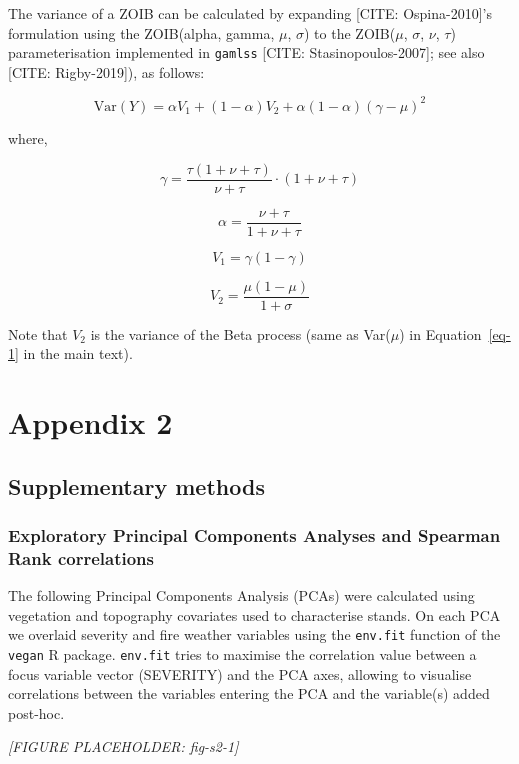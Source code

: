\documentclass[
  numafflabel,
  authoryear,
  preprint]{elsarticle}
\begin{document}
The variance of a ZOIB can be calculated by expanding {[}CITE:
Ospina-2010{]}'s formulation using the ZOIB(alpha, gamma, \(\mu\),
\(\sigma\)) to the ZOIB(\(\mu\), \(\sigma\), \(\nu\), \(\tau\))
parameterisation implemented in \texttt{gamlss} {[}CITE:
Stasinopoulos-2007{]}; see also {[}CITE: Rigby-2019{]}), as follows:

\[
\text{Var}(Y) = \alpha V_1 + (1 - \alpha) V_2 + \alpha (1 - \alpha)(\gamma - \mu)^2
\]

where,

\[
\gamma = \frac{\tau (1 + \nu + \tau)}{\nu + \tau} \cdot (1 + \nu + \tau)
\]

\[
\alpha = \frac{\nu + \tau}{1 + \nu + \tau}
\]

\[
V_1 = \gamma (1 - \gamma)
\]

\[
V_2 = \frac{\mu (1 - \mu)}{1 + \sigma}
\]

Note that \(V_2\) is the variance of the Beta process (same as
Var(\(\mu\)) in Equation~\ref{eq-1} in the main text).

\newpage{}

\section{Appendix 2}\label{appendix-2}

\subsection{Supplementary methods}\label{supplementary-methods}

\subsubsection{Exploratory Principal Components Analyses and Spearman
Rank
correlations}\label{exploratory-principal-components-analyses-and-spearman-rank-correlations}

The following Principal Components Analysis (PCAs) were calculated using
vegetation and topography covariates used to characterise stands. On
each PCA we overlaid severity and fire weather variables using the
\texttt{env.fit} function of the \texttt{vegan} R package.
\texttt{env.fit} tries to maximise the correlation value between a focus
variable vector (SEVERITY) and the PCA axes, allowing to visualise
correlations between the variables entering the PCA and the variable(s)
added post-hoc.

\newpage{}

\emph{{[}FIGURE PLACEHOLDER: fig-s2-1{]}}
\end{document}
